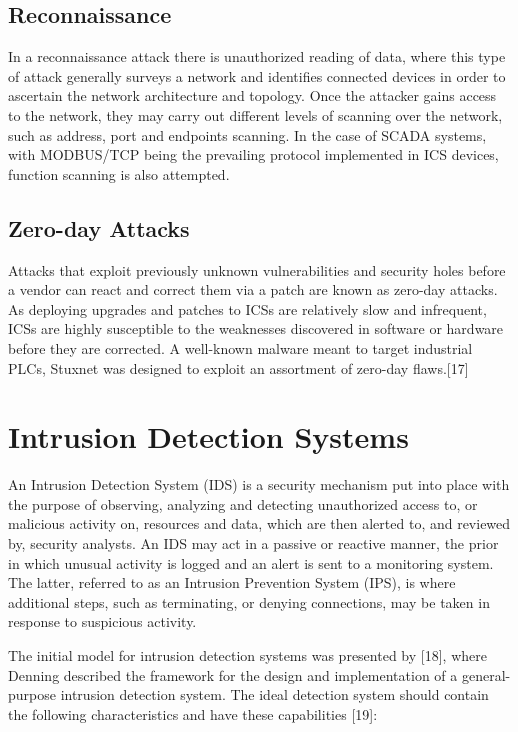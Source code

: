 \documentclass[11pt,a4paper]{article}
\begin{document}
\subsection{Reconnaissance}\label{reconnaissance}

In a reconnaissance attack there is unauthorized reading of data, where
this type of attack generally surveys a network and identifies connected
devices in order to ascertain the network architecture and topology.
Once the attacker gains access to the network, they may carry out
different levels of scanning over the network, such as address, port and
endpoints scanning. In the case of SCADA systems, with MODBUS/TCP being
the prevailing protocol implemented in ICS devices, function scanning is
also attempted.

\subsection{Zero-day Attacks}\label{zero-day-attacks}

Attacks that exploit previously unknown vulnerabilities and security
holes before a vendor can react and correct them via a patch are known
as zero-day attacks. As deploying upgrades and patches to ICSs are
relatively slow and infrequent, ICSs are highly susceptible to the
weaknesses discovered in software or hardware before they are corrected.
A well-known malware meant to target industrial PLCs, Stuxnet was
designed to exploit an assortment of zero-day flaws.{[}17{]}

\newpage

\section{Intrusion Detection Systems}\label{intrusion-detection-systems}

An Intrusion Detection System (IDS) is a security mechanism put into
place with the purpose of observing, analyzing and detecting
unauthorized access to, or malicious activity on, resources and data,
which are then alerted to, and reviewed by, security analysts. An IDS
may act in a passive or reactive manner, the prior in which unusual
activity is logged and an alert is sent to a monitoring system. The
latter, referred to as an Intrusion Prevention System (IPS), is where
additional steps, such as terminating, or denying connections, may be
taken in response to suspicious activity.

The initial model for intrusion detection systems was presented by
{[}18{]}, where Denning described the framework for the design and
implementation of a general-purpose intrusion detection system. The
ideal detection system should contain the following characteristics and
have these capabilities {[}19{]}:
\end{document}
